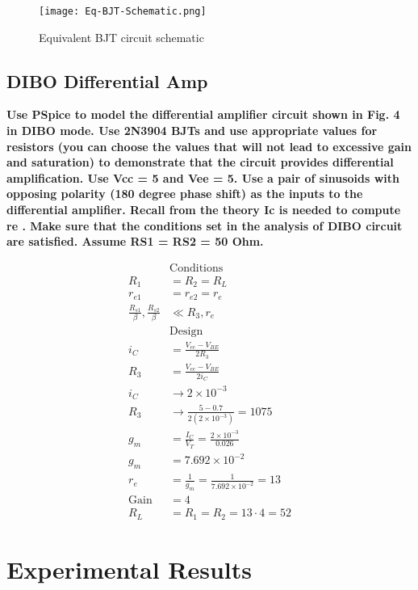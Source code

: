 \documentclass{article}
\begin{document}
\begin{figure}[H]
  \centering
  \texttt{[image: Eq-BJT-Schematic.png]}
  \caption{Equivalent BJT circuit schematic}
\end{figure}

\subsection*{DIBO Differential Amp}

\textbf{
Use PSpice to model the differential amplifier circuit shown in Fig. 4 in DIBO mode.
Use 2N3904 BJTs and use appropriate values for resistors (you can choose the
values that will not lead to excessive gain and saturation) to demonstrate that the
circuit provides differential amplification. Use Vcc = 5 and Vee = 5. Use a pair of
sinusoids with opposing polarity (180 degree phase shift) as the inputs to the
differential amplifier. Recall from the theory Ic 
is needed to compute re
. Make sure that the conditions set in the analysis of DIBO circuit are satisfied. 
Assume RS1 = RS2 = 50 Ohm.
}

\begin{align*}
 & \text{Conditions}\\
R_{1} & =R_{2} =R_{L}\\
r_{e1} & =r_{e2} =r_{e}\\
\frac{R_{s1}}{\beta } ,\frac{R_{s2}}{\beta } & \ll R_{3} ,r_{e}\\
 & \text{Design}\\
i_{C} & =\frac{V_{ee} -V_{BE}}{2R_{3}}\\
R_{3} & =\frac{V_{ee} -V_{BE}}{2i_{C}}\\
i_{C} & \rightarrow 2\times 10^{-3}\\
R_{3} & \rightarrow \frac{5-0.7}{2\left( 2\times 10^{-3}\right)} =1075\\
g_{m} & =\frac{I_{C}}{V_{T}} =\frac{2\times 10^{-3}}{0.026}\\
g_{m} & =7.692\times 10^{-2}\\
r_{e} & =\frac{1}{g_{m}} =\frac{1}{7.692\times 10^{-2}} =13\\
\text{Gain} & =4\\
R_{L} & =R_{1} =R_{2} =13\cdot 4=52
\end{align*}

\section*{Experimental Results}
\end{document}
